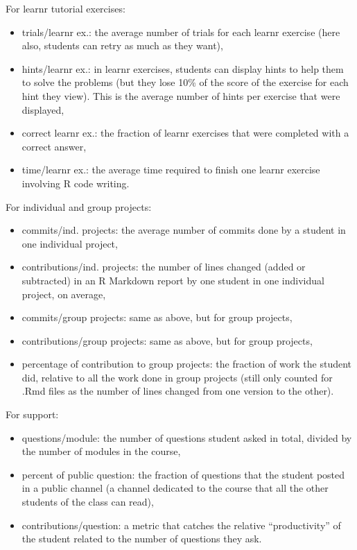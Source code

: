 \documentclass[
]{article}
\providecommand{\tightlist}{%
  \setlength{\itemsep}{0pt}\setlength{\parskip}{0pt}}
\begin{document}
For learnr tutorial exercises:

\begin{itemize}
\tightlist
\item
  trials/learnr ex.: the average number of trials for each learnr
  exercise (here also, students can retry as much as they want),
\item
  hints/learnr ex.: in learnr exercises, students can display hints to
  help them to solve the problems (but they lose 10\% of the score of
  the exercise for each hint they view). This is the average number of
  hints per exercise that were displayed,
\item
  correct learnr ex.: the fraction of learnr exercises that were
  completed with a correct answer,
\item
  time/learnr ex.: the average time required to finish one learnr
  exercise involving R code writing.
\end{itemize}

For individual and group projects:

\begin{itemize}
\tightlist
\item
  commits/ind. projects: the average number of commits done by a student
  in one individual project,
\item
  contributions/ind. projects: the number of lines changed (added or
  subtracted) in an R Markdown report by one student in one individual
  project, on average,
\item
  commits/group projects: same as above, but for group projects,
\item
  contributions/group projects: same as above, but for group projects,
\item
  percentage of contribution to group projects: the fraction of work the
  student did, relative to all the work done in group projects (still
  only counted for .Rmd files as the number of lines changed from one
  version to the other).
\end{itemize}

For support:

\begin{itemize}
\tightlist
\item
  questions/module: the number of questions student asked in total,
  divided by the number of modules in the course,
\item
  percent of public question: the fraction of questions that the student
  posted in a public channel (a channel dedicated to the course that all
  the other students of the class can read),
\item
  contributions/question: a metric that catches the relative
  ``productivity'' of the student related to the number of questions
  they ask.
\end{itemize}
\end{document}
